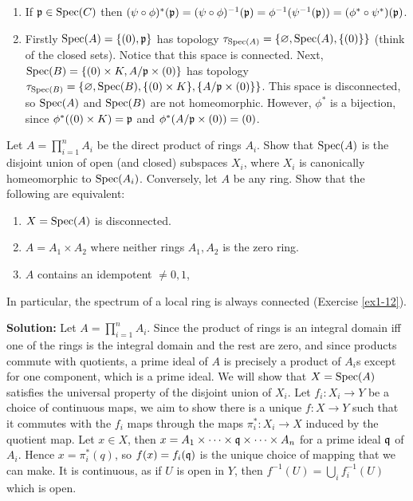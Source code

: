\documentclass{article}
\begin{document}
\begin{enumerate}
        Hence every prime \(\idealp \in X\) has \(\ker(\phi) \subseteq \idealp\), and so \(\ker(\phi) \subseteq \nilrad\).
    \item
        If \(\mathfrak{p} \in \operatorname{Spec}(C)\) then \((\psi \circ \phi)^*(\mathfrak{p}) = (\psi \circ \phi)^{-1}(\mathfrak{p}) = \phi^{-1}(\psi^{-1}(\mathfrak{p})) = (\phi^* \circ \psi^*)(\mathfrak{p})\).
    \item
        Firstly \(\operatorname{Spec}(A) = \{(0), \mathfrak{p}\}\) has topology \(\tau_{\operatorname{Spec}(A)} = \{\varnothing, \operatorname{Spec}(A), \{(0)\}\}\) (think of the closed sets).
        Notice that this space is connected.
        Next, \(\operatorname{Spec}(B) = \{(0) \times K, A/\mathfrak{p} \times (0)\}\) has topology \(\tau_{\operatorname{Spec}(B)} = \{\varnothing, \operatorname{Spec}(B), \{(0) \times K\}, \{A/\mathfrak{p} \times (0)\}\}\).
        This space is disconnected, so \(\operatorname{Spec}(A)\) and \(\operatorname{Spec}(B)\) are not homeomorphic.
        However, \(\phi^*\) is a bijection, since \(\phi^*((0) \times K) = \mathfrak{p}\) and \(\phi^*(A/\mathfrak{p} \times (0)) = (0)\).
\end{enumerate}

\begin{exercise}
    Let \(A = \prod_{i=1}^n A_i\) be the direct product of rings \(A_i\).
    Show that \(\operatorname{Spec}(A)\) is the disjoint union of open (and closed) subspaces \(X_i\), where \(X_i\) is canonically homeomorphic to \(\operatorname{Spec}(A_i)\).
    Conversely, let \(A\) be any ring.
    Show that the following are equivalent:
    \begin{enumerate}
        \item
            \(X = \operatorname{Spec}(A)\) is disconnected.
        \item
            \(A = A_1 \times A_2\) where neither rings \(A_1, A_2\) is the zero ring.
        \item
            \(A\) contains an idempotent \(\neq 0, 1\),
    \end{enumerate}
    In particular, the spectrum of a local ring is always connected (Exercise \ref{ex1-12}).
\end{exercise}

\noindent\textbf{Solution:}
Let \(A = \prod_{i=1}^n A_i\).
Since the product of rings is an integral domain iff one of the rings is the integral domain and the rest are zero, and since products commute with quotients, a prime ideal of \(A\) is precisely a product of \(A_i\)s except for one component, which is a prime ideal.
We will show that \(X = \operatorname{Spec}(A)\) satisfies the universal property of the disjoint union of \(X_i\).
Let \(f_i : X_i \to Y\) be a choice of continuous maps, we aim to show there is a unique \(f : X \to Y\) such that it commutes with the \(f_i\) maps through the maps \(\pi_i^* : X_i \to X\) induced by the quotient map.
Let \(x \in X\), then \(x = A_1 \times \dots \times \mathfrak{q} \times \dots \times A_n\) for a prime ideal \(\mathfrak{q}\) of \(A_i\).
Hence \(x = \pi_i^*(q)\), so \(f(x) = f_i(\mathfrak{q})\) is the unique choice of mapping that we can make.
It is continuous, as if \(U\) is open in \(Y\), then \(f^{-1}(U) = \bigcup_i f_i^{-1}(U)\) which is open.
\end{document}
